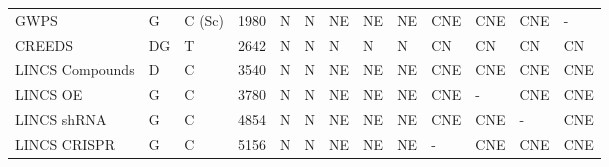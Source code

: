 \begin{table}[]
\begin{tabular}{lllllllllllll}
GWPS                                                                  & G                     & C (Sc)          & 1980                & N                 & N                 & NE                              & NE                           & NE                           & CNE                   & CNE               & CNE                  & -                         \\
CREEDS                                                                & DG                    & T               & 2642                & N                 & N                 & N                               & N                            & N                            & CN                    & CN                & CN                   & CN                        \\
LINCS Compounds                                                       & D                     & C               & 3540                & N                 & N                 & NE                              & NE                           & NE                           & CNE                   & CNE               & CNE                  & CNE                       \\
LINCS OE                                                              & G                     & C               & 3780                & N                 & N                 & NE                              & NE                           & NE                           & CNE                   & -                 & CNE                  & CNE                       \\
LINCS shRNA                                                           & G                     & C               & 4854                & N                 & N                 & NE                              & NE                           & NE                           & CNE                   & CNE               & -                    & CNE                       \\
LINCS CRISPR                                                          & G                     & C               & 5156                & N                 & N                 & NE                              & NE                           & NE                           & -                     & CNE               & CNE                  & CNE                       \\ \hline
\end{tabular}
\end{table}


